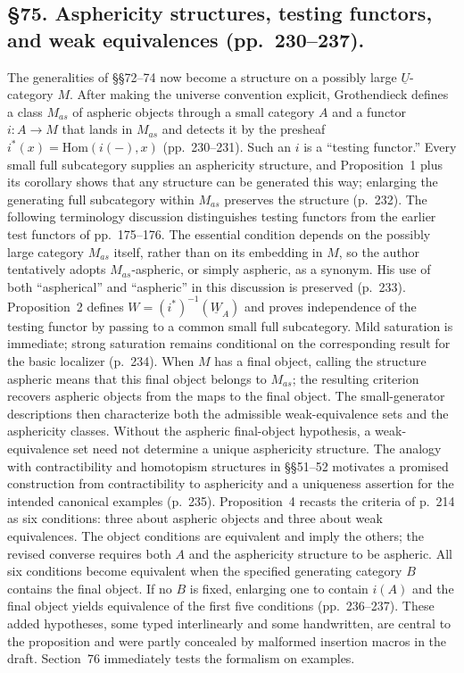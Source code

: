 \documentclass[10pt,oneside]{book}
\begin{document}
\subsection*{\S75. Asphericity structures, testing functors, and weak equivalences (pp.\ 230--237).}
The generalities of \S\S72--74 now become a structure on a possibly large $\underline U$-category $M$. After making the universe convention explicit, Grothendieck defines a class $M_{as}$ of aspheric objects through a small category $A$ and a functor $i:A\to M$ that lands in $M_{as}$ and detects it by the presheaf $i^*(x)=\mathrm{Hom}(i(-),x)$ (pp.\ 230--231). Such an $i$ is a “testing functor.” Every small full subcategory supplies an asphericity structure, and Proposition~1 plus its corollary shows that any structure can be generated this way; enlarging the generating full subcategory within $M_{as}$ preserves the structure (p.\ 232). The following terminology discussion distinguishes testing functors from the earlier test functors of pp.\ 175--176. The essential condition depends on the possibly large category $M_{as}$ itself, rather than on its embedding in $M$, so the author tentatively adopts $M_{as}$-aspheric, or simply aspheric, as a synonym. His use of both “aspherical” and “aspheric” in this discussion is preserved (p.\ 233).
Proposition~2 defines $W=(i^*)^{-1}(\underline W_A)$ and proves independence of the testing functor by passing to a common small full subcategory. Mild saturation is immediate; strong saturation remains conditional on the corresponding result for the basic localizer (p.\ 234). When $M$ has a final object, calling the structure aspheric means that this final object belongs to $M_{as}$; the resulting criterion recovers aspheric objects from the maps to the final object. The small-generator descriptions then characterize both the admissible weak-equivalence sets and the asphericity classes. Without the aspheric final-object hypothesis, a weak-equivalence set need not determine a unique asphericity structure. The analogy with contractibility and homotopism structures in \S\S51--52 motivates a promised construction from contractibility to asphericity and a uniqueness assertion for the intended canonical examples (p.\ 235). Proposition~4 recasts the criteria of p.\ 214 as six conditions: three about aspheric objects and three about weak equivalences. The object conditions are equivalent and imply the others; the revised converse requires both $A$ and the asphericity structure to be aspheric. All six conditions become equivalent when the specified generating category $B$ contains the final object. If no $B$ is fixed, enlarging one to contain $i(A)$ and the final object yields equivalence of the first five conditions (pp.\ 236--237). These added hypotheses, some typed interlinearly and some handwritten, are central to the proposition and were partly concealed by malformed insertion macros in the draft. Section~76 immediately tests the formalism on examples.
\end{document}

